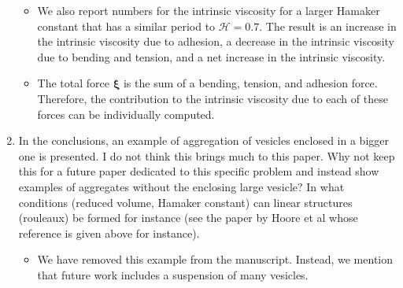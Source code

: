 \documentclass[11pt]{article}
\newcommand{\comment}[1]{{\color{blue} #1}}
\newcommand{\xxi}{\boldsymbol{\xi}}
\begin{document}
\begin{enumerate}
\begin{itemize}
  \item We also report numbers for the intrinsic viscosity for a larger
    Hamaker constant that has a similar period to $\mathcal{H} = 0.7$.
    The result is an increase in the intrinsic viscosity due to
    adhesion, a decrease in the intrinsic viscosity due to bending and
    tension, and a net increase in the intrinsic viscosity.

  \item The total force $\xxi$ is the sum of a bending, tension, and
    adhesion force.  Therefore, the contribution to the intrinsic
    viscosity due to each of these forces can be individually computed.
\end{itemize}

\item\comment{In the conclusions, an example of aggregation of vesicles enclosed
in a bigger one is presented. I do not think this brings much to this
paper. Why not keep this for a future paper dedicated to this specific
problem and instead show examples of aggregates without the enclosing
large vesicle? In what conditions (reduced volume, Hamaker constant)
can linear structures (rouleaux) be formed for instance (see the paper
by Hoore et al whose reference is given above for instance).}
\begin{itemize}
  \item We have removed this example from the manuscript.  Instead, we
    mention that future work includes a suspension of many vesicles.
\end{itemize}

\end{enumerate}
\end{document}
